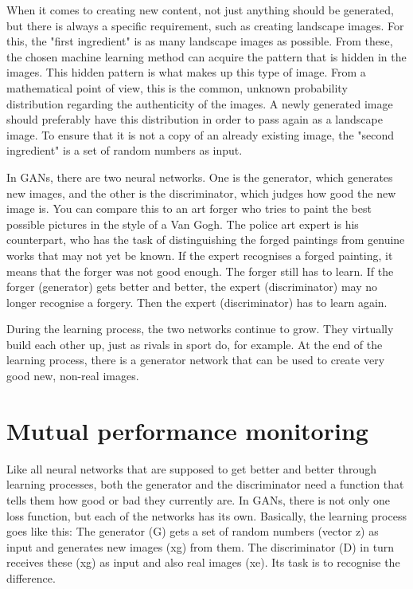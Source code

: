 When it comes to creating new content, not just anything should be generated, but there is always a specific requirement, such as creating landscape images. For this, the "first ingredient" is as many landscape images as possible. From these, the chosen machine learning method can acquire the pattern that is hidden in the images. This hidden pattern is what makes up this type of image. From a mathematical point of view, this is the common, unknown probability distribution regarding the authenticity of the images. A newly generated image should preferably have this distribution in order to pass again as a landscape image. To ensure that it is not a copy of an already existing image, the "second ingredient" is a set of random numbers as input.

In GANs, there are two neural networks. One is the generator, which generates new images, and the other is the discriminator, which judges how good the new image is. You can compare this to an art forger who tries to paint the best possible pictures in the style of a Van Gogh. The police art expert is his counterpart, who has the task of distinguishing the forged paintings from genuine works that may not yet be known. If the expert recognises a forged painting, it means that the forger was not good enough. The forger still has to learn. If the forger (generator) gets better and better, the expert (discriminator) may no longer recognise a forgery. Then the expert (discriminator) has to learn again.

During the learning process, the two networks continue to grow. They virtually build each other up, just as rivals in sport do, for example. At the end of the learning process, there is a generator network that can be used to create very good new, non-real images.

\section{Mutual performance monitoring}

Like all neural networks that are supposed to get better and better through learning processes, both the generator and the discriminator need a function that tells them how good or bad they currently are. In GANs, there is not only one loss function, but each of the networks has its own. Basically, the learning process goes like this: The generator (G) gets a set of random numbers (vector z) as input and generates new images (xg) from them. The discriminator (D) in turn receives these (xg) as input and also real images (xe). Its task is to recognise the difference.


